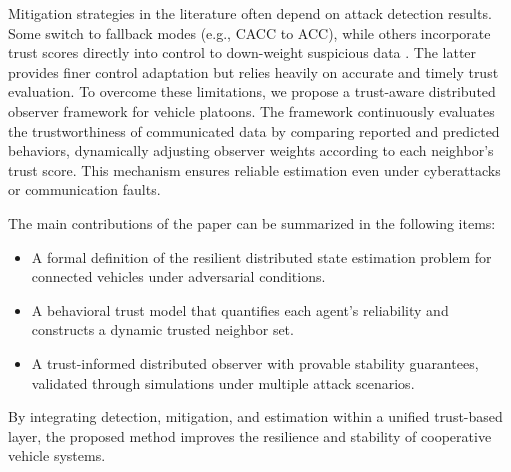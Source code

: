 %
Mitigation strategies in the literature often depend on attack detection results. Some switch to fallback modes (e.g., CACC to ACC), while others incorporate trust scores directly into control to down-weight suspicious data \cite{self_belive,Enhancing_control_trust}. The latter provides finer control adaptation but relies heavily on accurate and timely trust evaluation. To overcome these limitations, we propose a trust-aware distributed observer framework for vehicle platoons. The framework continuously evaluates the trustworthiness of communicated data by comparing reported and predicted behaviors, dynamically adjusting observer weights according to each neighbor's trust score. This mechanism ensures reliable estimation even under cyberattacks or communication faults.

The main contributions of the paper can be summarized in the following items:
\begin{itemize}
    \item A formal definition of the resilient distributed state estimation problem for connected vehicles under adversarial conditions.
    \item A behavioral trust model that quantifies each agent's reliability and constructs a dynamic trusted neighbor set.
    \item A trust-informed distributed observer with provable stability guarantees, validated through simulations under multiple attack scenarios.
\end{itemize}

By integrating detection, mitigation, and estimation within a unified trust-based layer, the proposed method improves the resilience and stability of cooperative vehicle systems.



